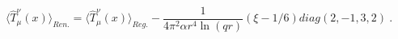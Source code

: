 \begin{equation}
\langle\hat{T}_\mu^\nu(x)\rangle_{Ren.}=\langle\hat{T}_\mu^\nu(x)\rangle_{Reg.}-
\frac1{4\pi^2\alpha r^4\ln(qr)}(\xi-1/6)diag(2,-1,3,2) \ .
\label{59}
\end{equation}

